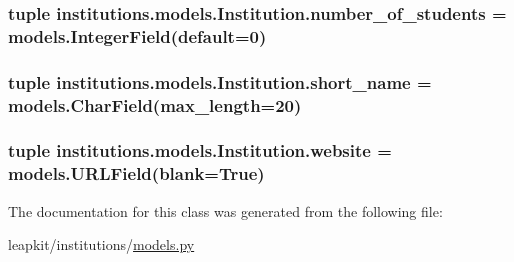 \hypertarget{classinstitutions_1_1models_1_1_institution_abbd1e8085f23c97a4df5063d7c2d10db}{
\subsubsection[{number\-\_\-of\-\_\-students}]{\setlength{\rightskip}{0pt plus 5cm}tuple institutions.\-models.\-Institution.\-number\-\_\-of\-\_\-students = models.\-Integer\-Field(default=0)\hspace{0.3cm}{\ttfamily [static]}}}\label{classinstitutions_1_1models_1_1_institution_abbd1e8085f23c97a4df5063d7c2d10db}
\hypertarget{classinstitutions_1_1models_1_1_institution_a4bde4b882a3be7afc56f079ef5c3c2f7}{
\subsubsection[{short\-\_\-name}]{\setlength{\rightskip}{0pt plus 5cm}tuple institutions.\-models.\-Institution.\-short\-\_\-name = models.\-Char\-Field(max\-\_\-length=20)\hspace{0.3cm}{\ttfamily [static]}}}\label{classinstitutions_1_1models_1_1_institution_a4bde4b882a3be7afc56f079ef5c3c2f7}
\hypertarget{classinstitutions_1_1models_1_1_institution_a034171aa4e9e08fb0d9ea18cb225f1f7}{
\subsubsection[{website}]{\setlength{\rightskip}{0pt plus 5cm}tuple institutions.\-models.\-Institution.\-website = models.\-U\-R\-L\-Field(blank=True)\hspace{0.3cm}{\ttfamily [static]}}}\label{classinstitutions_1_1models_1_1_institution_a034171aa4e9e08fb0d9ea18cb225f1f7}


The documentation for this class was generated from the following file\-:\begin{DoxyCompactItemize}
\item 
leapkit/institutions/\hyperlink{institutions_2models_8py}{models.\-py}\end{DoxyCompactItemize}

